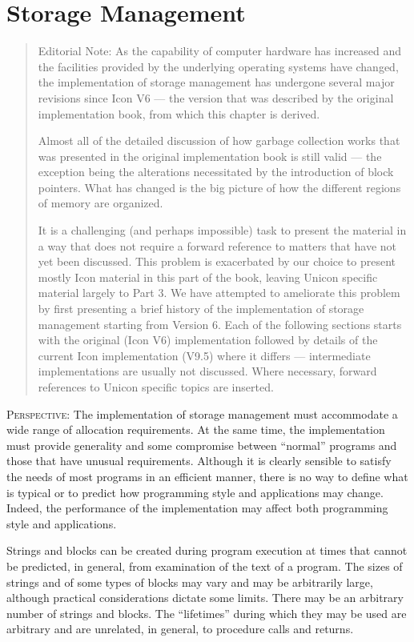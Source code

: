 \chapter{Storage Management}

\begin{quote}
Editorial Note: As the capability of computer hardware has increased
and the facilities provided by the underlying operating systems have
changed, the implementation of storage management has undergone
several major revisions since Icon V6 --- the version that was
described by the original implementation book, from which this chapter
is derived.

Almost all of the detailed discussion of how garbage collection works
that was presented in the original implementation book is still valid
--- the exception being the alterations necessitated by the introduction
of block pointers. What has changed is the big picture of how the
different regions of memory are organized.

It is a challenging (and perhaps impossible) task to present the
material in a way that does not require a forward reference to matters
that have not yet been discussed. This problem is exacerbated by our
choice to present mostly Icon material in this part of the book,
leaving Unicon specific material largely to Part 3. We have attempted
to ameliorate this problem by first presenting a brief history of the
implementation of storage management starting from Version 6.  Each of
the following sections starts with the original (Icon V6)
implementation followed by details of the current Icon implementation
(V9.5) where it differs --- intermediate implementations are usually
not discussed. Where necessary, forward references to Unicon specific
topics are inserted.
\end{quote}

\textsc{Perspective}: The implementation of storage management must
accommodate a wide range of allocation requirements.  At the same
time, the implementation must provide generality and some compromise
between ``normal'' programs and those that have unusual
requirements. Although it is clearly sensible to satisfy the needs of
most programs in an efficient manner, there is no way to define what
is typical or to predict how programming style and applications may
change. Indeed, the performance of the implementation may affect both
programming style and applications.

Strings and blocks can be created during program execution at times
that cannot be predicted, in general, from examination of the text of
a program. The sizes of strings and of some types of blocks may vary
and may be arbitrarily large, although practical considerations
dictate some limits. There may be an arbitrary number of strings and
blocks.  The ``lifetimes'' during which they may be used are arbitrary
and are unrelated, in general, to procedure calls and returns.

